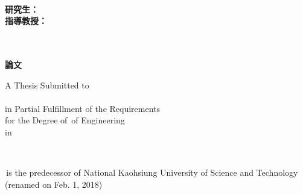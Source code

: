 
\begin{titlepage}
\vspace*{1mm}

\begin{center}

{\LARGE\bfseries  \titletw}\\
\vspace{15mm}
{\LARGE  \titleen}
\vspace{15mm}

{\large\bfseries{研究生：}\large\authortwname\\
\large\bfseries{指導教授：}\large\supervisortwname}

\vspace{15mm}
{\Large\bfseries{\schooltwname}\\
\vspace{4.5mm}
\Large\bfseries{}\\
\vspace{4.5mm}
\Large\bfseries \degreetw 論文}\\
\vspace{10mm}

\vspace{4.5mm}
A Thesis Submitted to \deptenname\\
\schoolenname\\
in Partial Fulfillment of the Requirements\\
for the Degree of \degreeen \,of Engineering\\
in \majortwname

\vspace{15mm}
\dateen\\
\schoolenlocation

\vspace{10mm}
\schoolenoldname \,is the predecessor of
National Kaohsiung University of
Science and Technology (renamed on Feb. 1, 2018)

\vspace{10mm}
\fontsize{14pt}{0pt}{\bfseries{\dateROC }}

\end{center}

\end{titlepage} 